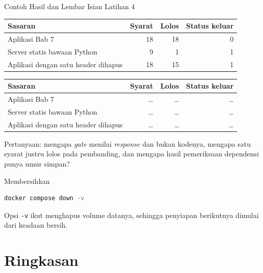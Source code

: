 \documentclass[aspectratio=169, table, 12pt]{beamer}
\begin{document}
\begin{frame}{{\Large Contoh Hasil dan Lembar Isian Latihan 4}}
  \vspace{4pt}
  \centering
  {\footnotesize
  \begin{tabularx}{\textwidth}{Yrrr}
    \hline
    \textbf{Sasaran} & \textbf{Syarat} & \textbf{Lolos} & \textbf{Status keluar} \\
    \hline
    Aplikasi Bab 7 & 18 & 18 & 0 \\
    \hline
    Server statis bawaan Python & 9 & 1 & 1 \\
    \hline
    Aplikasi dengan satu header dihapus & 18 & 15 & 1 \\
    \hline
  \end{tabularx}}

  \vspace{6pt}
  \centering
  {\footnotesize
  \begin{tabularx}{\textwidth}{Yrrr}
    \hline
    \textbf{Sasaran} & \textbf{Syarat} & \textbf{Lolos} & \textbf{Status keluar} \\
    \hline
    Aplikasi Bab 7 & \dots & \dots & \dots \\
    \hline
    Server statis bawaan Python & \dots & \dots & \dots \\
    \hline
    Aplikasi dengan satu header dihapus & \dots & \dots & \dots \\
    \hline
  \end{tabularx}}

  \vspace{4pt}
  {\footnotesize Pertanyaan: mengapa \textit{gate} menilai \textit{response} dan
  bukan kodenya, mengapa satu syarat justru lolos pada pembanding, dan
  mengapa hasil pemeriksaan dependensi punya umur simpan?}
\end{frame}

\begin{frame}[fragile]{{\Large Membersihkan}}
  \vspace{2pt}
\begin{lstlisting}[language=bash]
docker compose down -v
\end{lstlisting}
  \vspace{6pt}
  {\small Opsi \texttt{-v} ikut menghapus volume datanya, sehingga penyiapan
  berikutnya dimulai dari keadaan bersih.}
\end{frame}

\section{Ringkasan}
\end{document}
